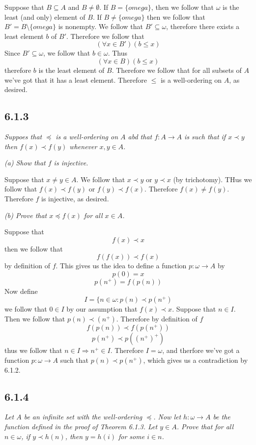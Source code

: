 \documentclass[11pt,oneside,titlepage]{book}
\DeclareMathOperator \ra {\Rightarrow}
\begin{document}
Suppose that $B \subseteq A$ and $B \neq \emptyset$. If $B = \{omega\}$, then
we follow that $\omega$ is the least (and only) element of $B$. If
$B \neq \{omega\}$ then we follow that $B' = B \setminus \{omega\}$ is nonempty. We follow that
$B' \subseteq \omega$, therefore there exists a least element $b$ of $B'$. Therefore
we follow that
$$(\forall x \in B')(b \leq x)$$
Since $B' \subseteq \omega$, we follow that $b \in \omega$. Thus
$$(\forall x \in B)(b \leq x)$$
therefore $b$ is the least element of $B$. Therefore we follow that
for all subsets of $A$ we've got that it has a least element. Therefore
$\leq$ is a well-ordering on $A$, as desired.

\subsection*{6.1.3}

\textit{Suppoes that $\preceq$ is a well-ordering on $A$ abd that $f: A \to A$ is
  such that if $x \prec y$ then $f(x) \prec f(y)$ whenever $x, y \in A$. }

\textit{(a) Show that $f$ is injective.}

Suppose that $x \neq y \in A$. We follow that $x \prec y$ or $y \prec x$ (by trichotomy).
THus we follow that $f(x) \prec f(y)$ or $f(y) \prec f(x)$. Therefore $f(x) \neq f(y)$.
Therefore $f$ is injective, as desired.

\textit{(b) Prove that $x \preceq f(x)$ for all $x \in A$.}

Suppose that
$$f(x) \prec x$$
then we follow that
$$f(f(x)) \prec f(x)$$
by definition of $f$. This gives us the idea to define a function $p: \omega \to A$ by
$$p(0) = x$$
$$p(n^+) = f(p(n))$$
Now define
$$I = \{n \in \omega: p(n) \prec p(n^+)$$
we follow that $0 \in I$ by our assumption that $f(x) \prec x$. Suppose that
$n \in I$. Then we follow that $p(n) \prec(n^+)$. Therefore by definition of
$f$
$$f(p(n)) \prec f(p(n^+))$$
$$p(n^+) \prec p((n^+)^+)$$
thus we follow that $n \in I \ra n^+ \in I$. Therefore $I = \omega$, and therfore
we've got a function $p: \omega \to A$ such that $p(n) \prec p(n^+)$, which
gives us a contradiction by 6.1.2.

\subsection*{6.1.4}

\textit{Let $A$ be an infinite set with the well-ordering $\preceq$. Now let
  $h: \omega \to A$ be the function defined in the proof of Theorem 6.1.3. Let $y \in A$.
  Prove that for all $n \in \omega$, if $y \prec h(n)$, then $y = h(i)$ for
  some $i \in n$.}
\end{document}
